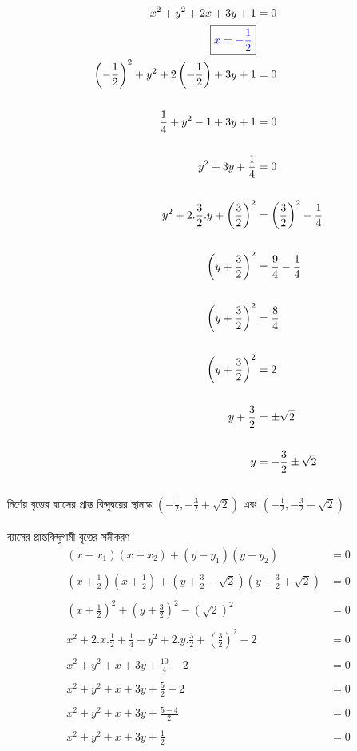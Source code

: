 \documentclass{article}
\begin{document}
	\begin{align*}
		x^2+y^2+2x+3y+1&=0\\
		\boxed{\textcolor{blue}{x=-\frac{1}{2}}}&\\
		\left(-\frac{1}{2}\right)^2+y^2+2\left(-\frac{1}{2}\right)+3y+1&=0\\
		\\
		\frac{1}{4}+y^2-1+3y+1&=0\\
		\\
		y^2+3y+\frac{1}{4}&=0\\
		\\
		y^2+2.\frac{3}{2}.y+\left(\frac{3}{2}\right)^2&=\left(\frac{3}{2}\right)^2-\frac{1}{4}\\
		\\
		\left(y+\frac{3}{2}\right)^2&=\frac{9}{4}-\frac{1}{4}\\
		\\
		\left(y+\frac{3}{2}\right)^2&=\frac{8}{4}\\
		\\
		\left(y+\frac{3}{2}\right)^2&=2\\
		\\
		y+\frac{3}{2}&=\pm \sqrt{2}\\
		\\
		y&=-\frac{3}{2}\pm\sqrt{2}\\
	\end{align*}
	\\ 
	নির্ণেয় বৃত্তের ব্যাসের প্রান্ত বিন্দুদ্বয়ের স্থানাঙ্ক $\left(-\frac{1}{2},-\frac{3}{2}+\sqrt{2}\right)$ এবং $\left(-\frac{1}{2},-\frac{3}{2}-\sqrt{2}\right)$\\
	\\
	ব্যাসের প্রান্তবিন্দুগামী বৃত্তের সমীকরণ \\ 
	\begin{align*}
		(x-x_1)(x-x_2)+(y-y_1)(y-y_2)&=0\\
		\\
		\left(x+\frac{1}{2}\right) \left(x+\frac{1}{2}\right)+\left(y+\frac{3}{2}-\sqrt{2}\right)\left(y+\frac{3}{2}+\sqrt{2}\right)&=0\\
		\\
		\left(x+\frac{1}{2}\right)^2+\left(y+\frac{3}{2}\right)^2-(\sqrt{2})^2&=0\\
		\\
		x^2+2.x.\frac{1}{2}+\frac{1}{4}+y^2+2.y.\frac{3}{2}+\left(\frac{3}{2}\right)^2-2&=0\\
		\\
		x^2+y^2+x+3y+\frac{10}{4}-2&=0\\
		\\
		x^2+y^2+x+3y+\frac{5}{2}-2&=0\\
		\\
		x^2+y^2+x+3y+\frac{5-4}{2}&=0\\
		\\
		x^2+y^2+x+3y+\frac{1}{2}&=0\\
	\end{align*}
\end{document}
